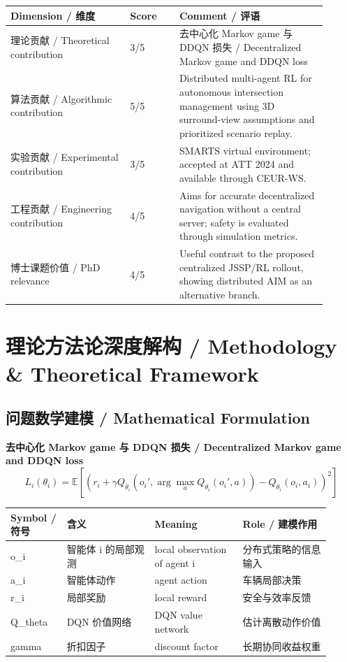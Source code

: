 \documentclass[UTF8,a4paper,11pt,fontset=fandol]{ctexart}
\begin{document}
\begin{longtable}{p{0.34\linewidth}p{0.14\linewidth}p{0.42\linewidth}}
\toprule
Dimension / 维度 & Score & Comment / 评语\\
\midrule
理论贡献 / Theoretical contribution & 3/5 & 去中心化 Markov game 与 DDQN 损失 / Decentralized Markov game and DDQN loss \\
算法贡献 / Algorithmic contribution & 5/5 & Distributed multi-agent RL for autonomous intersection management using 3D surround-view assumptions and prioritized scenario replay. \\
实验贡献 / Experimental contribution & 3/5 & SMARTS virtual environment; accepted at ATT 2024 and available through CEUR-WS. \\
工程贡献 / Engineering contribution & 4/5 & Aims for accurate decentralized navigation without a central server; safety is evaluated through simulation metrics. \\
博士课题价值 / PhD relevance & 4/5 & Useful contrast to the proposed centralized JSSP/RL rollout, showing distributed AIM as an alternative branch. \\
\bottomrule
\end{longtable}

\section{理论方法论深度解构 / Methodology \& Theoretical Framework}
\subsection{问题数学建模 / Mathematical Formulation}
\textbf{去中心化 Markov game 与 DDQN 损失 / Decentralized Markov game and DDQN loss}
\[
L_i(\theta_i)=\mathbb{E}\left[\left(r_i+\gamma Q_{\bar\theta_i}(o_i',\arg\max_a Q_{\theta_i}(o_i',a))-Q_{\theta_i}(o_i,a_i)\right)^2\right]
\]
\begin{longtable}{p{0.16\linewidth}p{0.25\linewidth}p{0.25\linewidth}p{0.25\linewidth}}
\toprule
Symbol / 符号 & 含义 & Meaning & Role / 建模作用\\
\midrule
o\_i & 智能体 i 的局部观测 & local observation of agent i & 分布式策略的信息输入 \\
a\_i & 智能体动作 & agent action & 车辆局部决策 \\
r\_i & 局部奖励 & local reward & 安全与效率反馈 \\
Q\_theta & DQN 价值网络 & DQN value network & 估计离散动作价值 \\
gamma & 折扣因子 & discount factor & 长期协同收益权重 \\
\bottomrule
\end{longtable}
\end{document}
